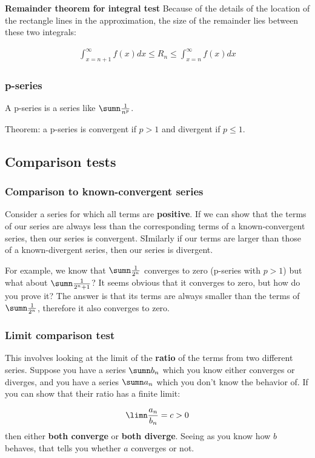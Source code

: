 \textbf{Remainder theorem for integral test}
Because of the details of the location of the rectangle lines in the approximation, the size of the remainder lies between these two integrals:

\begin{align*}
  \int_{x=n+1}^\infty f(x) dx \leq R_n \leq \int_{x=n}^\infty f(x) dx
\end{align*}


\subsubsection{p-series}

A p-series is a series like $\sumn \frac{1}{n^p}$.

Theorem: a p-series is convergent if $p>1$ and divergent if $p \leq 1$.

\subsection{Comparison tests}

\subsubsection{Comparison to known-convergent series}
Consider a series for which all terms are \textbf{positive}. If we can show that the terms of our series are always less than the corresponding terms of a known-convergent series, then our series is convergent. SImilarly if our terms are larger than those of a known-divergent series, then our series is divergent.

For example, we know that $\sumn\frac{1}{2^n}$ converges to zero (p-series with $p > 1$) but what about $\sumn\frac{1}{2^n + 1}$? It seems obvious that it converges to zero, but how do you prove it? The answer is that its terms are always smaller than the terms of $\sumn\frac{1}{2^n}$, therefore it also converges to zero.


\subsubsection{Limit comparison test}
This involves looking at the limit of the \textbf{ratio} of the terms from two different series. Suppose you have a series $\sumn b_n$ which you know either converges or diverges, and you have a series $\sumn a_n$ which you don't know the behavior of. If you can show that their ratio has a finite limit:

\begin{align*}
  \limn \frac{a_n}{b_n} = c > 0
\end{align*}
then either \textbf{both converge} or \textbf{both diverge}. Seeing as you know how $b$ behaves, that tells you whether $a$ converges or not.


